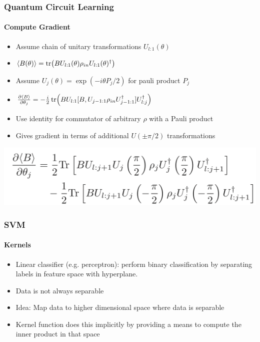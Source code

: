 \documentclass{beamer}
\newcommand\0{\mathbf{0}}
\begin{document}
  \begin{frame}
  	\frametitle{Quantum Circuit Learning}
  	\framesubtitle{Compute Gradient}
  	\begin{itemize}
  	\item Assume chain of unitary transformations $U_{l:1}(\theta)$
  	\item $\langle B(\theta) \rangle = \tr (B U_{l:1}(\theta) \rho_{in} U_{l:1}(\theta)^\dag )$
  	\item Assume $U_j(\theta) = \exp(-i \theta P_j / 2)$ for pauli product $P_j$ 
  	\item $\frac{\partial \langle B \rangle}{\partial \theta_j} = -\frac{i}{2}\tr(BU_{l:1} [ B, U_{j-1:1} \rho_{in}U^\dag_{j-1:1}] U^\dag_{l:j})$ 
  	\item Use identity for commutator of arbitrary $\rho$ with a Pauli product
  	\item Gives gradient in terms of additional $U(\pm \pi / 2)$ transformations
  	\end{itemize}
  	\includegraphics[width=\textwidth]{gradient.png}
  \end{frame}
  
  \begin{frame}
  	\frametitle{SVM}
  	\framesubtitle{Kernels}
  	\begin{itemize}
  	\item Linear classifier (e.g. perceptron): perform binary classification by separating labels in feature space with hyperplane.
  	\item Data is not always separable
  	\item Idea: Map data to higher dimensional space where data is separable
  	\item Kernel function does this implicitly by providing a means to compute the inner product in that space
  	\end{itemize}
  \end{frame}
  
\end{document}
